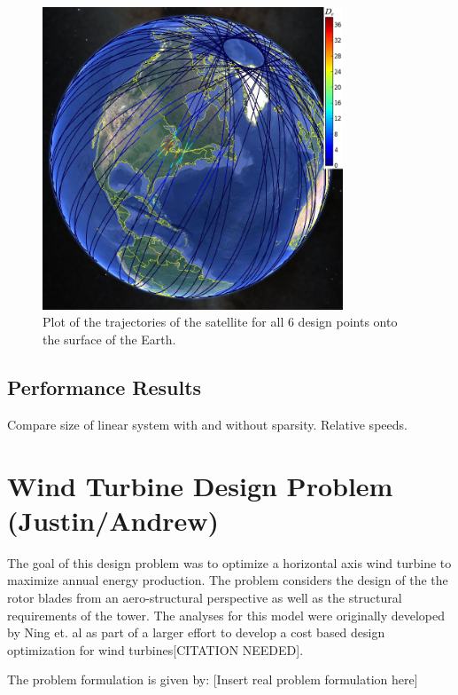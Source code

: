 \documentclass[]{aiaa-tc} %
\begin{document}
        \begin{figure}
        \centering
        \includegraphics[width=0.8\textwidth]{images/allpts_gearth2}
        \caption[width=0.4\textwidth]{Plot of the trajectories of the satellite
        for all 6 design points onto the surface of the Earth.
        \label{allpt_g_earth}
        }

        \end{figure}

        \subsection{Performance Results}
            Compare size of linear system with and without sparsity. Relative speeds.


  \section{Wind Turbine Design Problem (Justin/Andrew)}

    The goal of this design problem was to optimize a horizontal axis wind turbine
    to maximize annual energy production. The problem considers the design of 
    the the rotor blades from an aero-structural perspective as well as the structural requirements of the tower. The analyses for this model were originally developed 
    by Ning et. al as part of a larger effort to develop a cost based design optimization
    for wind turbines[CITATION NEEDED].

    The problem formulation is given by: [Insert real problem formulation here]
\end{document}
